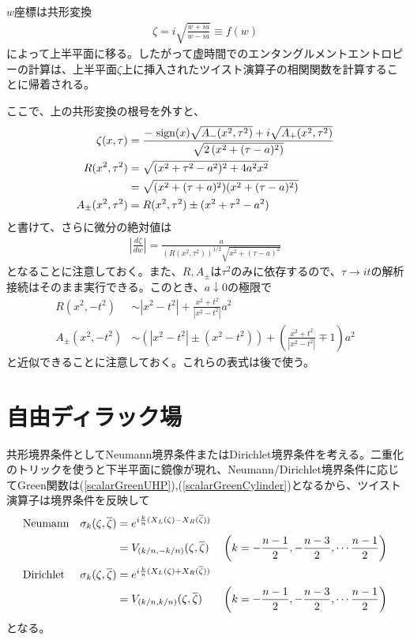 $w$座標は共形変換
\begin{align}
\zeta=i\sqrt{\frac{w+ia}{w-ia}}\equiv f(w)
\end{align}
によって上半平面に移る。したがって虚時間でのエンタングルメントエントロピーの計算は、上半平面$\zeta$上に挿入されたツイスト演算子の相関関数を計算することに帰着される。

ここで、上の共形変換の根号を外すと、
\begin{align}
\zeta(x,\tau)&=\frac{-\ \text{sign}(x)\sqrt{A_{-}(x^2,\tau^2)}+i\sqrt{A_{+}(x^2,\tau^2)}}{\sqrt{2\left(x^2+(\tau-a)^2\right)}}\\
R(x^2,\tau^2)&=\sqrt{(x^2+\tau^2-a^2)^2+4a^2 x^2}\notag\\
&=\sqrt{(x^2+(\tau+a)^2)(x^2+(\tau-a)^2)}\\
A_\pm(x^2,\tau^2) &= R(x^2,\tau^2)\pm(x^2+\tau^2-a^2)
\end{align}
と書けて、さらに微分の絶対値は
\begin{align}
\left| \frac{d\zeta}{dw} \right|=\frac{a}{(R(x^2,\tau^2))^{1/2}\sqrt{x^2+(\tau-a)^2}}
\end{align}
となることに注意しておく。また、$R,A_\pm$は$\tau^2$のみに依存するので、$\tau\to it$の解析接続はそのまま実行できる。このとき、$a \downarrow 0$の極限で
\begin{align}
R(x^2,-t^2)&\sim |x^2-t^2|+\frac{x^2+t^2}{|x^2-t^2|}a^2  \\
A_{\pm}(x^2,-t^2)&\sim \left( |x^2-t^2|\pm (x^2-t^2) \right)+\left( \frac{x^2+t^2}{|x^2-t^2|}\mp 1 \right)a^2
\end{align}
と近似できることに注意しておく。これらの表式は後で使う。

\section{自由ディラック場}\label{sec:SPQdirac}
共形境界条件としてNeumann境界条件またはDirichlet境界条件を考える。二重化のトリックを使うと下半平面に鏡像が現れ、Neumann/Dirichlet境界条件に応じてGreen関数は(\ref{scalarGreenUHP}),(\ref{scalarGreenCylinder})となるから、ツイスト演算子は境界条件を反映して
\begin{align}
&&&\text{Neumann}&\sigma_k(\zeta,\overline{\zeta})&=e^{i\frac{k}{n}(X_L(\zeta)-X_R(\overline{\zeta}))}\notag\\
&&&&&=V_{(k/n,-k/n)}(\zeta,\overline{\zeta})&&\left(k=-\frac{n-1}{2},-\frac{n-3}{2},\cdots \frac{n-1}{2}\right)\\
&&&\text{Dirichlet}&\sigma_k(\zeta,\overline{\zeta})&=e^{i\frac{k}{n}(X_L(\zeta)+X_R(\overline{\zeta}))}\notag\\
&&&&&=V_{(k/n,k/n)}(\zeta,\overline{\zeta})&&\left(k=-\frac{n-1}{2},-\frac{n-3}{2},\cdots \frac{n-1}{2}\right)
\end{align}
となる。

